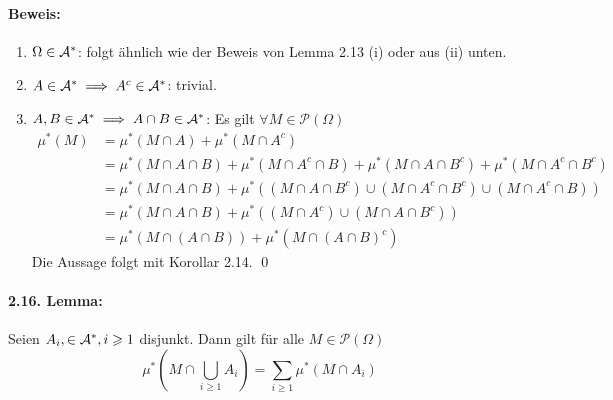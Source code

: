 \documentclass[12pt]{report}
\begin{document}
\paragraph{Beweis:}
\begin{enumerate}[label=(\roman*)]
    \item $\Omega\in\mathcal{A}^*$: folgt \"ahnlich wie der Beweis von Lemma 2.13 (i) oder aus (ii) unten.
    \item $A\in\mathcal{A}^*\implies A^c\in\mathcal{A}^*$: trivial.
    \item $A,B\in\mathcal{A}^*\implies A\cap B\in\mathcal{A}^*$: Es gilt $\forall M\in\mathcal{P}(\Omega)$
    \begin{align*}
        \mu^*(M)&=\mu^*(M\cap A)+\mu^*(M\cap A^c)\\
        &=\mu^*(M\cap A\cap B)+\mu^*(M\cap A^c\cap B)+\mu^*(M\cap A\cap B^c)+\mu^*(M\cap A^c\cap B^c)\\
        &=\mu^*(M\cap A\cap B)+\mu^*\left((M\cap A\cap B^c)\cup(M\cap A^c\cap B^c)\cup(M\cap A^c\cap B)\right)\\
        &=\mu^*(M\cap A\cap B)+\mu^*\left((M\cap A^c)\cup(M\cap A\cap B^c)\right)\\
        &=\mu^*(M\cap(A\cap B))+\mu^*(M\cap(A\cap B)^c)
    \end{align*}
    Die Aussage folgt mit Korollar 2.14. \qed
\end{enumerate}

\paragraph{2.16. Lemma:}Seien $A_i,\in\mathcal{A}^*,i\geqslant1$ disjunkt. Dann gilt f\"ur alle $M\in\mathcal{P}(\Omega)$
$$\mu^*\left(M\cap\bigcup_{i\geq1}A_i\right)=\sum_{i\geq1}\mu^*(M\cap A_i)$$
\end{document}
